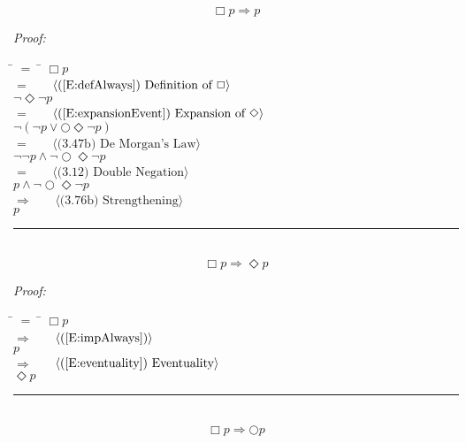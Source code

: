 \documentclass[fleqn, leqno]{article}
\newcommand{\lgap}{2pt}                             %
\newcommand{\mymathindent}{24pt}                      %
\newcommand{\next}{\bigcirc}
\newcommand{\event}{\Diamond}
\newcommand{\always}{\Box}
\newcommand{\myqed}{\hfill\rule[-.23ex]{1.2ex}{2.0ex}}
\newcommand{\Gll} {\langle}                         %
\newcommand{\Ggg} {\rangle}                         %
\newcommand{\Hint}[1]     {\ \ \ $\Gll              \mbox{#1} \Ggg$ }   %
\begin{document}
\begin{equation}\label{E:impAlways}
\always p \Rightarrow p
\end{equation}

\emph{Proof:}
\begin{tabbing}
\hspace{\mymathindent} \= $= \;$ \= \kill
  \> \>   $\always p$\\[\lgap]
  \> $=$  \>  \Hint{(\ref{E:defAlways}) Definition of $\always$}\\[\lgap]
  \> \>   $\lnot\event\lnot p$\\[\lgap]
  \> $=$  \>  \Hint{(\ref{E:expansionEvent}) Expansion of $\event$}\\[\lgap]
  \> \>   $\lnot(\lnot p \lor \next\event\lnot p)$\\[\lgap]
  \> $=$  \>  \Hint{(3.47b) De Morgan's Law}\\[\lgap]
  \> \>   $\lnot\lnot p \land \lnot\next\event\lnot p$\\[\lgap]
  \> $=$  \>  \Hint{(3.12) Double Negation}\\[\lgap]
  \> \>   $p \land \lnot\next\event\lnot p$\\[\lgap]
  \> $\Rightarrow$  \>  \Hint{(3.76b) Strengthening}\\[\lgap]
  \> \>   $p$\\[\lgap]
\end{tabbing}
\myqed\\[\lgap]


\begin{equation}\label{E:impAlwaysE}
\always p \Rightarrow \event p
\end{equation}

\emph{Proof:}
\begin{tabbing}
\hspace{\mymathindent} \= $= \;$ \= \kill
  \> \>   $\always p$\\[\lgap]
  \> $\Rightarrow$  \>  \Hint{(\ref{E:impAlways})}\\[\lgap]
  \> \>   $p$\\[\lgap]
  \> $\Rightarrow$  \>  \Hint{(\ref{E:eventuality}) Eventuality}\\[\lgap]
  \> \>   $\event p$\\[\lgap]
\end{tabbing}
\myqed\\[\lgap]


\begin{equation}\label{E:impAlwaysN}
\always p \Rightarrow \next p
\end{equation}
\end{document}
